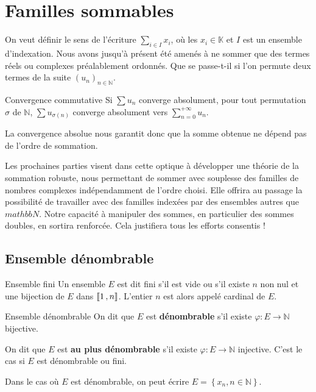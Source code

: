 \section{Familles sommables} 

    On veut définir le sens de l’écriture $\sum_{i \in I} x_i$, où les $x_i \in \mathbb{K}$ et $I$ est un ensemble d’indexation. Nous avons jusqu’à présent été amenés à ne sommer que des termes réels ou complexes préalablement ordonnés. Que se passe-t-il si l’on permute deux termes de la suite $(u_n)_{n \in \mathbb{N}}$. 

    \begin{theo}{Convergence commutative}{}
        Si $\sum u_n$ converge absolument, pour tout permutation $\sigma$ de $\mathbb{N}$, $\sum u_{\sigma(n)}$ converge absolument vers $\sum_{n = 0}^{+\infty} u_n$.
    \end{theo}

    La convergence absolue nous garantit donc que la somme obtenue ne dépend pas de l’ordre de sommation.

    Les prochaines parties visent dans cette optique à développer une théorie de la sommation robuste, nous permettant de sommer avec souplesse des familles de nombres complexes indépendamment de l’ordre choisi. Elle offrira au passage la possibilité de travailler avec des familles indexées par des ensembles autres que $mathbb{N}$. Notre capacité à manipuler des sommes, en particulier des sommes doubles, en sortira renforcée. Cela justifiera tous les efforts consentis !

    \subsection{Ensemble dénombrable}

    \begin{defi}{Ensemble fini}{}
        Un ensemble $E$ est dit fini s’il est vide ou s’il existe $n$ non nul et une bijection de $E$ dans $\left\llbracket 1 \, , n \right\rrbracket$. L’entier $n$ est alors appelé cardinal de $E$.
    \end{defi}

    \begin{defi}{Ensemble dénombrable}{}
        On dit que $E$ est \textbf{dénombrable} s’il existe $\varphi : E \to \mathbb{N}$ bijective.

        On dit que $E$ est \textbf{au plus dénombrable} s’il existe $\varphi : E \to \mathbb{N}$ injective. C’est le cas si $E$ est dénombrable ou fini.

        Dans le cas où $E$ est dénombrable, on peut écrire $E = \left\{x_n , n \in \mathbb{N}\right\}$.
    \end{defi}

